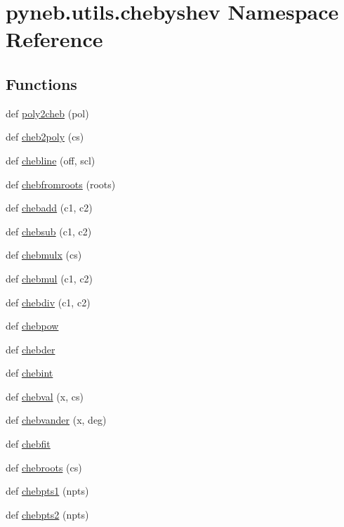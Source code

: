 \hypertarget{namespacepyneb_1_1utils_1_1chebyshev}{}\section{pyneb.\+utils.\+chebyshev Namespace Reference}
\label{namespacepyneb_1_1utils_1_1chebyshev}
\subsection*{Functions}
\begin{DoxyCompactItemize}
\item 
def \hyperlink{namespacepyneb_1_1utils_1_1chebyshev_a1f91018c86380adf38318e4e224279e7}{poly2cheb} (pol)
\item 
def \hyperlink{namespacepyneb_1_1utils_1_1chebyshev_a640344fc14aa36e14d0e93eba4411188}{cheb2poly} (cs)
\item 
def \hyperlink{namespacepyneb_1_1utils_1_1chebyshev_ad14ae6340a5a9e3c93c1bb720f4e5a04}{chebline} (off, scl)
\item 
def \hyperlink{namespacepyneb_1_1utils_1_1chebyshev_abedf5cf14ea9229321fc5e4043c42a0d}{chebfromroots} (roots)
\item 
def \hyperlink{namespacepyneb_1_1utils_1_1chebyshev_a06a85eb72ae35925336a6b550dec3f02}{chebadd} (c1, c2)
\item 
def \hyperlink{namespacepyneb_1_1utils_1_1chebyshev_ac07c70b217882a8c0a731ce9fdf743f0}{chebsub} (c1, c2)
\item 
def \hyperlink{namespacepyneb_1_1utils_1_1chebyshev_ab09f8accee50bd964e03071a659a7b5f}{chebmulx} (cs)
\item 
def \hyperlink{namespacepyneb_1_1utils_1_1chebyshev_aca5aab8be2c47559d4489fd1dac11f75}{chebmul} (c1, c2)
\item 
def \hyperlink{namespacepyneb_1_1utils_1_1chebyshev_aa84df28815f29342a7cdce9b95470f02}{chebdiv} (c1, c2)
\item 
def \hyperlink{namespacepyneb_1_1utils_1_1chebyshev_ab647ff3aa7750a09b934b98cddd4c90d}{chebpow}
\item 
def \hyperlink{namespacepyneb_1_1utils_1_1chebyshev_a1ed2b9248c247449584904025ec9d460}{chebder}
\item 
def \hyperlink{namespacepyneb_1_1utils_1_1chebyshev_a233e686a07b9935c74ce1e053f0c5f5f}{chebint}
\item 
def \hyperlink{namespacepyneb_1_1utils_1_1chebyshev_a7f7442e9a3a00e1ca04a2283877b15a8}{chebval} (x, cs)
\item 
def \hyperlink{namespacepyneb_1_1utils_1_1chebyshev_aa9deae857486c8ee69362ded985b09d8}{chebvander} (x, deg)
\item 
def \hyperlink{namespacepyneb_1_1utils_1_1chebyshev_a6bb5eb95525fd0572aea52fcd2a12c6c}{chebfit}
\item 
def \hyperlink{namespacepyneb_1_1utils_1_1chebyshev_a2f01a14e36b415a2f3ebc67c95cceb26}{chebroots} (cs)
\item 
def \hyperlink{namespacepyneb_1_1utils_1_1chebyshev_a5ac57e95809a1f627400a7c3a34606f7}{chebpts1} (npts)
\item 
def \hyperlink{namespacepyneb_1_1utils_1_1chebyshev_a224bc370de0cfa204c3ac15d626d13e3}{chebpts2} (npts)
\end{DoxyCompactItemize}
